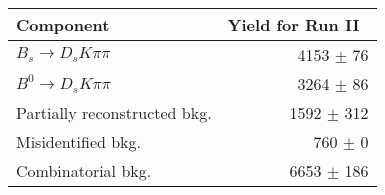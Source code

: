  \begin{tabular}{l r }
\hline\hline
Component & Yield for Run II\ \\
\hline
$B_s \to D_s K \pi \pi$ & 4153 $\pm$ 76 \\
$B^{0} \to D_s K \pi \pi$ & 3264 $\pm$ 86 \\
Partially reconstructed bkg. & 1592 $\pm$ 312 \\
Misidentified bkg. & 760 $\pm$ 0 \\
Combinatorial bkg. & 6653 $\pm$ 186 \\
\hline\hline
\end{tabular}
\label{table:signalYields_run2}
